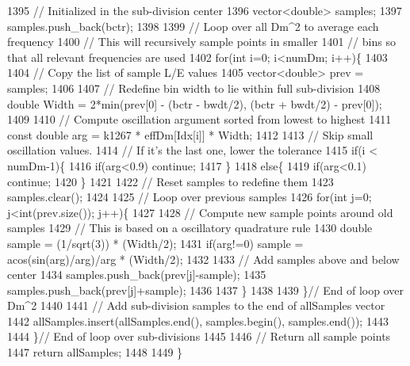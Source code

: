 \begin{DoxyCode}
1395     \textcolor{comment}{// Initialized in the sub-division center}
1396     vector<double> samples;
1397     samples.push\_back(bctr);
1398 
1399     \textcolor{comment}{// Loop over all Dm^2 to average each frequency}
1400     \textcolor{comment}{// This will recursively sample points in smaller}
1401     \textcolor{comment}{// bins so that all relevant frequencies are used}
1402     \textcolor{keywordflow}{for}(\textcolor{keywordtype}{int} i=0; i<numDm; i++)\{
1403 
1404       \textcolor{comment}{// Copy the list of sample L/E values}
1405       vector<double> prev = samples;
1406 
1407       \textcolor{comment}{// Redefine bin width to lie within full sub-division}
1408       \textcolor{keywordtype}{double} Width = 2*min(prev[0] - (bctr - bwdt/2), (bctr + bwdt/2) - prev[0]);
1409 
1410       \textcolor{comment}{// Compute oscillation argument sorted from lowest  to highest}
1411       \textcolor{keyword}{const} \textcolor{keywordtype}{double} arg = k1267 * effDm[Idx[i]] * Width;
1412 
1413       \textcolor{comment}{// Skip small oscillation values.}
1414       \textcolor{comment}{// If it's the last one, lower the tolerance}
1415       \textcolor{keywordflow}{if}(i < numDm-1)\{
1416         \textcolor{keywordflow}{if}(arg<0.9) \textcolor{keywordflow}{continue};
1417       \}
1418       \textcolor{keywordflow}{else}\{
1419         \textcolor{keywordflow}{if}(arg<0.1) \textcolor{keywordflow}{continue};
1420       \}
1421 
1422       \textcolor{comment}{// Reset samples to redefine them}
1423       samples.clear();
1424 
1425       \textcolor{comment}{// Loop over previous samples}
1426       \textcolor{keywordflow}{for}(\textcolor{keywordtype}{int} j=0; j<int(prev.size()); j++)\{
1427 
1428         \textcolor{comment}{// Compute new sample points around old samples}
1429         \textcolor{comment}{// This is based on a oscillatory quadrature rule}
1430         \textcolor{keywordtype}{double} sample = (1/sqrt(3)) * (Width/2);
1431         \textcolor{keywordflow}{if}(arg!=0) sample = acos(sin(arg)/arg)/arg * (Width/2);
1432 
1433         \textcolor{comment}{// Add samples above and below center}
1434         samples.push\_back(prev[j]-sample);
1435         samples.push\_back(prev[j]+sample);
1436 
1437       \}
1438 
1439     \}\textcolor{comment}{// End of loop over Dm^2}
1440 
1441     \textcolor{comment}{// Add sub-division samples to the end of allSamples vector}
1442     allSamples.insert(allSamples.end(), samples.begin(), samples.end());
1443 
1444   \}\textcolor{comment}{// End of loop over sub-divisions}
1445 
1446   \textcolor{comment}{// Return all sample points}
1447   \textcolor{keywordflow}{return} allSamples;
1448 
1449 \}
\end{DoxyCode}
\mbox{\label{classOscProb_1_1PMNS__Base_adf23b569112f9f9e0e592f01d79a5f3d}} 
